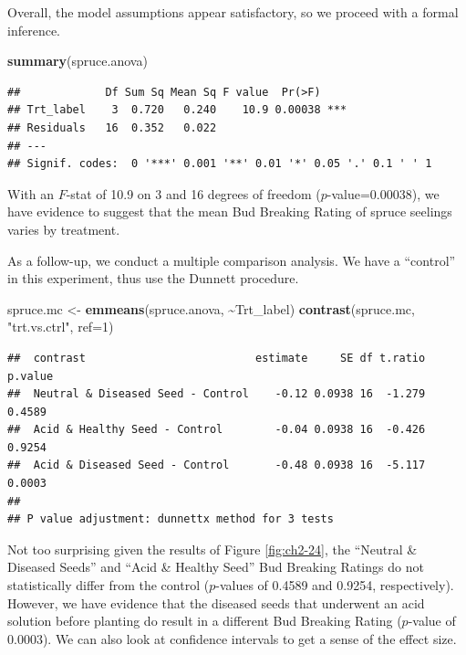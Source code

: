 \documentclass[
]{book}
\newenvironment{Shaded}{\begin{snugshade}}{\end{snugshade}}
\newcommand{\AttributeTok}[1]{\textcolor[rgb]{0.13,0.29,0.53}{#1}}
\newcommand{\DecValTok}[1]{\textcolor[rgb]{0.00,0.00,0.81}{#1}}
\newcommand{\FunctionTok}[1]{\textcolor[rgb]{0.13,0.29,0.53}{\textbf{#1}}}
\newcommand{\NormalTok}[1]{#1}
\newcommand{\OtherTok}[1]{\textcolor[rgb]{0.56,0.35,0.01}{#1}}
\newcommand{\SpecialCharTok}[1]{\textcolor[rgb]{0.81,0.36,0.00}{\textbf{#1}}}
\newcommand{\StringTok}[1]{\textcolor[rgb]{0.31,0.60,0.02}{#1}}
\begin{document}
Overall, the model assumptions appear satisfactory, so we proceed with a formal inference.

\begin{Shaded}
\begin{Highlighting}[]
\FunctionTok{summary}\NormalTok{(spruce.anova)}
\end{Highlighting}
\end{Shaded}

\begin{verbatim}
##             Df Sum Sq Mean Sq F value  Pr(>F)    
## Trt_label    3  0.720   0.240    10.9 0.00038 ***
## Residuals   16  0.352   0.022                    
## ---
## Signif. codes:  0 '***' 0.001 '**' 0.01 '*' 0.05 '.' 0.1 ' ' 1
\end{verbatim}

With an \(F\)-stat of 10.9 on 3 and 16 degrees of freedom (\(p\)-value=0.00038), we have evidence to suggest that the mean Bud Breaking Rating of spruce seelings varies by treatment.

As a follow-up, we conduct a multiple comparison analysis.
We have a ``control'' in this experiment, thus use the Dunnett procedure.

\begin{Shaded}
\begin{Highlighting}[]
\NormalTok{spruce.mc }\OtherTok{\textless{}{-}} \FunctionTok{emmeans}\NormalTok{(spruce.anova, }\SpecialCharTok{\textasciitilde{}}\NormalTok{Trt\_label)}
\FunctionTok{contrast}\NormalTok{(spruce.mc, }\StringTok{"trt.vs.ctrl"}\NormalTok{, }\AttributeTok{ref=}\DecValTok{1}\NormalTok{)}
\end{Highlighting}
\end{Shaded}

\begin{verbatim}
##  contrast                          estimate     SE df t.ratio p.value
##  Neutral & Diseased Seed - Control    -0.12 0.0938 16  -1.279  0.4589
##  Acid & Healthy Seed - Control        -0.04 0.0938 16  -0.426  0.9254
##  Acid & Diseased Seed - Control       -0.48 0.0938 16  -5.117  0.0003
## 
## P value adjustment: dunnettx method for 3 tests
\end{verbatim}

Not too surprising given the results of Figure \ref{fig:ch2-24}, the ``Neutral \& Diseased Seeds'' and ``Acid \& Healthy Seed'' Bud Breaking Ratings do not statistically differ from the control (\(p\)-values of 0.4589 and 0.9254, respectively).
However, we have evidence that the diseased seeds that underwent an acid solution before planting do result in a different Bud Breaking Rating (\(p\)-value of 0.0003).
We can also look at confidence intervals to get a sense of the effect size.
\end{document}
